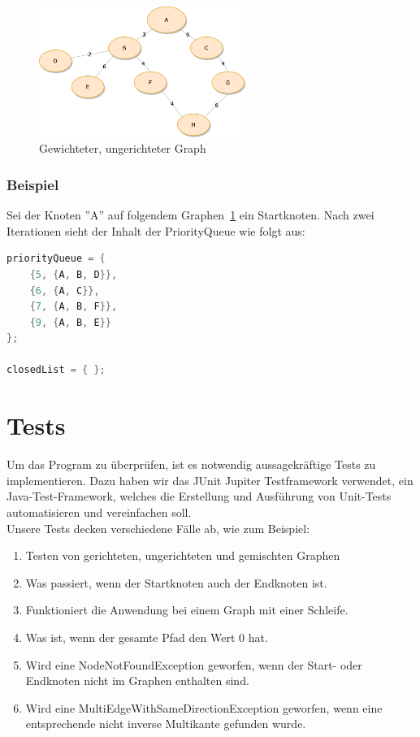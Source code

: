 \documentclass[a4paper]{article}
\begin{document}
\begin{figure}[htbp]
	\centering
		\includegraphics[width=0.60\textwidth]{Figs/Beispielgraph_2.png}		
	\caption{Gewichteter, ungerichteter Graph}
	\label{fig:beispielgraph_2}
\end{figure}

\subsubsection{Beispiel}

Sei der Knoten ''A'' auf folgendem Graphen~\ref{fig:beispielgraph_2} ein Startknoten.
Nach zwei Iterationen sieht der Inhalt der PriorityQueue wie folgt aus:\\

\begin{lstlisting}[language = java, frame = trBL]
priorityQueue = {
    {5, {A, B, D}},
    {6, {A, C}},
    {7, {A, B, F}},
    {9, {A, B, E}}
};

closedList = { };
\end{lstlisting}

\newpage

\section{Tests}

Um das Program zu überprüfen, ist es notwendig aussagekräftige Tests zu implementieren. Dazu haben wir das JUnit Jupiter Testframework verwendet, ein Java-Test-Framework, welches die Erstellung und Ausführung von Unit-Tests automatisieren und vereinfachen soll.\\

Unsere Tests decken verschiedene Fälle ab, wie zum Beispiel:

\begin{enumerate}
    \item Testen von gerichteten, ungerichteten und gemischten Graphen
    \item Was passiert, wenn der Startknoten auch der Endknoten ist.
    \item Funktioniert die Anwendung bei einem Graph mit einer Schleife.
    \item Was ist, wenn der gesamte Pfad den Wert 0 hat.
    \item Wird eine NodeNotFoundException geworfen, wenn der Start- oder Endknoten nicht im Graphen enthalten sind.
    \item Wird eine MultiEdgeWithSameDirectionException geworfen, wenn eine entsprechende nicht inverse Multikante gefunden wurde.
\end{enumerate}
\end{document}
